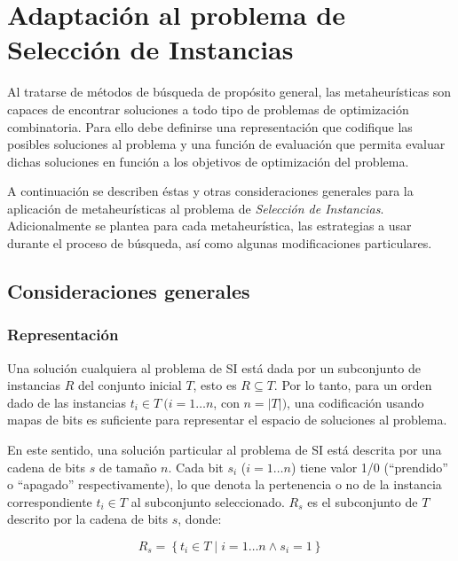 \chapter{Adaptación al problema de Selección de Instancias}
\label{capitulo3}

Al tratarse de métodos de búsqueda de propósito general, las metaheurísticas son capaces de encontrar soluciones a todo tipo de problemas de optimización combinatoria. Para ello debe definirse una representación que codifique las posibles soluciones al problema y una función de evaluación que permita evaluar dichas soluciones en función a los objetivos de optimización del problema.

A continuación se describen éstas y otras consideraciones generales para la aplicación de metaheurísticas al problema de \emph{Selección de Instancias}. Adicionalmente se plantea para cada metaheurística, las estrategias a usar durante el proceso de búsqueda, así como algunas modificaciones particulares.

\section{Consideraciones generales}

\subsection{Representación}

Una solución cualquiera al problema de SI está dada por un subconjunto de instancias $R$ del conjunto inicial $T$, esto es $R \subseteq T$. Por lo tanto, para un orden dado de las instancias $t_i \in T\ (i = 1 \dots n$, con $n = \vert T \vert)$, una codificación usando mapas de bits es suficiente para representar el espacio de soluciones al problema.

En este sentido, una solución particular al problema de SI está descrita por una cadena de bits $s$ de tamaño $n$. Cada bit $s_i$ ($i = 1 \dots n$) tiene valor 1/0 (``prendido'' o ``apagado'' respectivamente), lo que denota la pertenencia o no de la instancia correspondiente $t_i \in T$ al subconjunto seleccionado. $R_s$ es el subconjunto de $T$ descrito por la cadena de bits $s$, donde:

\begin{equation}
R_s = \left\lbrace t_i \in T \mid i = 1 \dots n \land s_i = 1 \right\rbrace
\end{equation}

